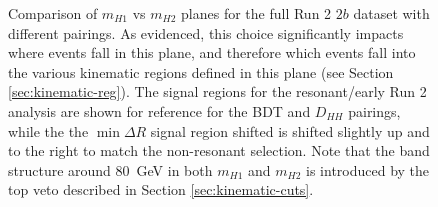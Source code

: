 \begin{figure}[ht]
\centering
{}

\caption{\label{fig:pairing-massplanes} Comparison of $m_{H1}$ vs $m_{H2}$ planes for the full Run 2 $2b$ 
dataset with different pairings. As evidenced, this choice significantly impacts where events 
fall in this plane, and therefore which events fall into the various kinematic regions defined in 
this plane (see Section \ref{sec:kinematic-reg}). The signal regions for the resonant/early Run 2 analysis 
are shown for reference for the BDT and $D_{HH}$ pairings, while the the $\min\Delta R$ signal region shifted 
is shifted slightly up and to the right to match the non-resonant 
selection. Note that the band structure around \SI{80}{\GeV} in both $m_{H1}$ and $m_{H2}$ is introduced 
by the top veto described in Section \ref{sec:kinematic-cuts}.}
\end{figure}


